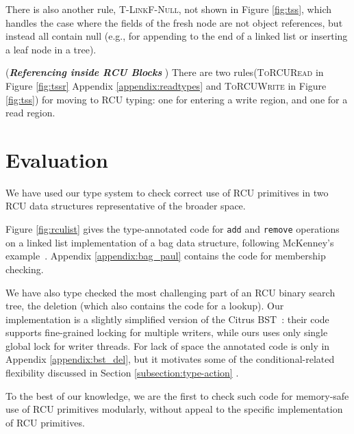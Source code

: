 
There is also another rule, \textsc{T-LinkF-Null}, not shown in Figure \ref{fig:tss}, which handles the case where the fields of the fresh node are not object references, but instead all contain null (e.g., for appending to the end of a linked list or inserting a leaf node in a tree).

(\textit{\textbf{Referencing inside \textsf{RCU} Blocks} })
There are two rules(\textsc{ToRCURead} in Figure \ref{fig:tssr} Appendix \ref{appendix:readtypes} and \textsc{ToRCUWrite} in Figure \ref{fig:tss}) for moving to \textsf{RCU} typing: one for entering a write region, and one for a read region.
\section{Evaluation}
\label{sec:eval}
We have used our type system to check correct use of RCU primitives in two RCU data structures representative of the broader space.

Figure \ref{fig:rculist} gives the type-annotated code for \lstinline|add| and \lstinline|remove| operations on a linked list implementation of a bag data structure, following McKenney's example~\cite{McKenney2015SomeEO}.
Appendix \ref{appendix:bag_paul} contains the code for membership checking.

We have also type checked the most challenging part of an RCU binary search tree, the deletion (which also contains the code for a lookup).
Our implementation is a slightly simplified version of the Citrus BST~\cite{Arbel:2014:CUR:2611462.2611471}: their code supports fine-grained locking for multiple writers, while ours uses only single global lock for writer threads.
For lack of space the annotated code is only in Appendix \ref{appendix:bst_del}, but it motivates some of the conditional-related flexibility discussed in Section \ref{subsection:type-action} .

To the best of our knowledge, we are the first to check such code for memory-safe use of RCU primitives modularly, without appeal to the specific implementation of RCU primitives.
